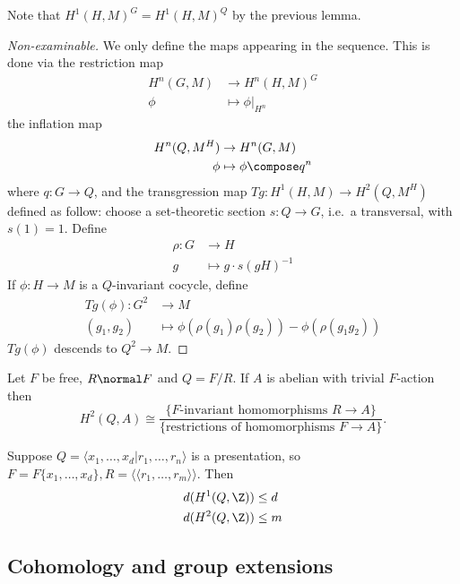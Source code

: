 \documentclass[a4paper]{article}
\begin{document}
Note that \(H^1(H, M)^G = H^1(H, M)^Q\) by the previous lemma.

\begin{proof}[Non-examinable]
  We only define the maps appearing in the sequence. This is done via the restriction map
  \begin{align*}
    H^n(G, M) &\to H^n(H, M)^G \\
    \phi &\mapsto \phi|_{H^n}
  \end{align*}
  the inflation map
  \begin{align*}
    H^n(Q, M^H) &\to H^n(G, M) \\
    \phi &\mapsto \phi \compose q^n
  \end{align*}
  where \(q: G \to Q\), and the transgression map \(Tg: H^1(H, M) \to H^2(Q, M^H)\) defined as follow: choose a set-theoretic section \(s: Q \to G\), i.e.\ a transversal, with \(s(1) = 1\). Define
  \begin{align*}
    \rho: G &\to H \\
    g &\mapsto g \cdot s(gH)^{-1}
  \end{align*}
  If \(\phi: H \to M\) is a \(Q\)-invariant cocycle, define
  \begin{align*}
    Tg(\phi): G^2 &\to M \\
    (g_1, g_2) &\mapsto \phi(\rho(g_1)\rho(g_2)) - \phi(\rho(g_1g_2))
  \end{align*}
  \(Tg(\phi)\) descends to \(Q^2 \to M\).
\end{proof}

\begin{corollary}
  Let \(F\) be free, \(R \normal F\) and \(Q = F/R\). If \(A\) is abelian with trivial \(F\)-action then
  \[
    H^2(Q, A) \cong \frac{\{\text{\(F\)-invariant homomorphisms } R \to A\}}{\{\text{restrictions of homomorphisms } F \to A\}}.
  \]
\end{corollary}

\begin{eg}
  Suppose \(Q = \langle x_1, \dots, x_d| r_1, \dots, r_n \rangle\) is a presentation, so \(F = F \{x_1, \dots, x_d\}, R = \langle\langle r_1, \dots, r_m \rangle\rangle\). Then
  \begin{align*}
    d(H^1(Q, \Z)) &\leq d \\
    d(H^2(Q, \Z)) &\leq m
  \end{align*}
\end{eg}

\subsection{Cohomology and group extensions}
\end{document}
